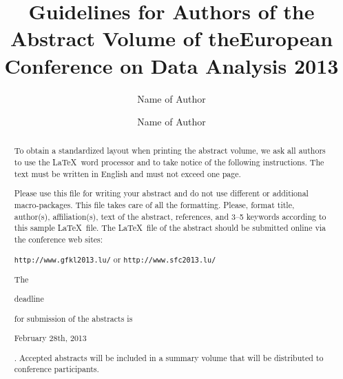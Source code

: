 \documentclass{svmult}
\begin{document}
\title*{Guidelines for Authors of the\protect\linebreak
Abstract Volume of the\protect\linebreak European Conference on Data Analysis 2013}

\author{Name of Author\and
Name of Author}
%
%
\maketitle

\begin{abstract}
To obtain a standardized layout when printing the abstract volume,
we ask all authors to use the \LaTeX\ word processor and to take
notice of the following instructions. The text must be written in
English and must not exceed one page. 

Please use this file for writing your abstract and do not use 
different or additional macro-packages.
This file takes care of all the
formatting. Please, format title, author(s), affiliation(s), text of
the abstract, references, and 3--5 keywords according to this sample
\LaTeX\ file. The \LaTeX\ file of the abstract should be submitted
online via the conference web sites:
%
\begin{center}
{\tt http://www.gfkl2013.lu/} or {\tt http://www.sfc2013.lu/}
\end{center}
%
The\begin{bf} deadline\end{bf} for submission of the abstracts is\begin{bf}
February 28th, 2013\end{bf}. Accepted abstracts will be included in
a summary volume that will be distributed to conference
participants.
\end{abstract}
\end{document}
